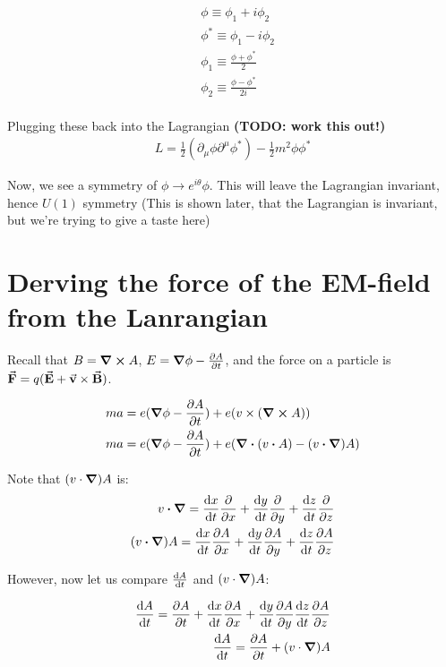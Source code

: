 \begin{align*}
&\phi \equiv \phi_1 + i \phi_2 \\
&\phi^* \equiv \phi_1 - i \phi_2 \\
&\phi_1 \equiv \frac{\phi + \phi^*}{2} \\
&\phi_2 \equiv   \frac{\phi - \phi^*}{2i} \\
\end{align*}

Plugging these back into the Lagrangian \textbf{(TODO: work this out!)}
\begin{align*}
L = \frac{1}{2}(\partial_\mu \phi \partial^\mu \phi^*) - \frac{1}{2}m^2 \phi \phi^*
\end{align*}

Now, we see a symmetry of $\phi \to e^{i \theta}\phi$. This will leave the Lagrangian invariant, hence
$U(1)$ symmetry (This is shown later, that the Lagrangian is invariant, but we're trying to give a taste here)

\section{Derving the force of the EM-field from the Lanrangian}

Recall that $B = \curl A$, $E = \grad \phi - \pdv{A}{t}$, and the force
on a particle is $\va F = q (\va E + \va v \times \va B)$.

\begin{align*}
ma &= e (\grad \phi - \pdv{A}{t}) + e (v \times (\curl A)) \\
ma &= e (\grad \phi - \pdv{A}{t}) + e (\div (v \vdot A) - (v \vdot \grad) A)
\end{align*}

Note that $(v \cdot \grad) A$ is:
\begin{align*}
v \vdot \grad = \dv{x}{t} \pdv{x} + \dv{y}{t} \pdv{y} + \dv{z}{t} \pdv{z} \\
(v \vdot \grad) A = \dv{x}{t} \pdv{A}{x} + \dv{y}{t} \pdv{A}{y} + \dv{z}{t} \pdv{A}{z} \\
\end{align*}

However, now let us compare $\dv{A}{t}$ and $(v \cdot \grad) A$:

\begin{align*}
\dv{A}{t} = \pdv{A}{t} + \dv{x}{t}\pdv{A}{x} + \dv{y}{t}\pdv{A}{y} \dv{z}{t}\pdv{A}{z} \\
\dv{A}{t} = \pdv{A}{t} + (v \cdot \grad) A
\end{align*}

